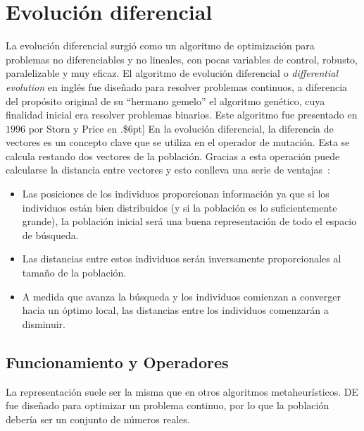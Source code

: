 \section{Evolución diferencial}
La evolución diferencial surgió como un algoritmo de optimización para problemas no diferenciables y no lineales, con pocas variables de control, robusto, paralelizable y muy eficaz. El algoritmo de evolución diferencial o \textit{differential evolution} en inglés fue diseñado para resolver problemas continuos, a diferencia del propósito original de su ``hermano gemelo'' el algoritmo genético, cuya finalidad inicial era resolver problemas binarios. Este algoritmo fue presentado en $1996$ por Storn y Price en \cite{storn_differential_1997}.\$6pt]
En la evolución diferencial, la diferencia de vectores es un concepto clave que se utiliza en el operador de mutación. Esta se calcula restando dos vectores de la población. Gracias a esta operación puede calcularse la distancia entre vectores y esto conlleva una serie de ventajas~\cite{storn_differential_1997}:
\begin{itemize}
    \item Las posiciones de los individuos proporcionan información ya que si los individuos están bien distribuidos (y si la población es lo suficientemente grande), la población inicial será una buena representación de todo el espacio de búsqueda.
    \item Las distancias entre estos individuos serán inversamente proporcionales al tamaño de la población.
    \item A medida que avanza la búsqueda y los individuos comienzan a converger hacia un óptimo local, las distancias entre los individuos comenzarán a disminuir.
\end{itemize}

\subsection{Funcionamiento y Operadores}
La representación suele ser la misma que en otros algoritmos metaheurísticos. DE fue diseñado para optimizar un problema continuo, por lo que la población debería ser un conjunto de números reales.

